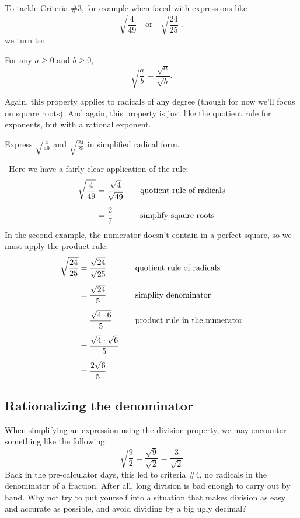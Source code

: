 To tackle Criteria \#3, for example when faced with expressions like \[\sqrt{\frac{4}{49}} \quad\text{or}\quad \sqrt{\frac{24}{25}}~,\]we turn to:

\begin{boxeddef}
For any $a \geq 0$ and $b \geq 0$, \[\sqrt{\frac{a}{b}} = \dfrac{\sqrt{a}}{\sqrt{b}}.\]
\end{boxeddef}

Again, this property applies to radicals of any degree (though for now we'll focus on square roots). And again, this property is just like the quotient rule for exponents, but with a rational exponent.

\begin{boxedex}
Express $\sqrt{\frac{4}{49}}$ and $\sqrt{\frac{24}{25}}$ in simplified radical form.

\exsoln\ Here we have a fairly clear application of the rule:
\[\begin{aligned}
\sqrt{\frac{4}{49}}	&= \frac{\sqrt{4}}{\sqrt{49}}
&& \text{\quad quotient rule of radicals}\\[1ex]
&= \frac{2}{7}
&& \text{\quad simplify sqaure roots}\\
\end{aligned}
\]
In the second example, the numerator doesn't contain in a perfect square, so we must apply the product rule.
\[\begin{aligned}
\sqrt{\frac{24}{25}}	&= \frac{\sqrt{24}}{\sqrt{25}}
&& \text{\quad quotient rule of radicals}\\[1ex]
&= \frac{\sqrt{24}}{5}
&& \text{\quad simplify denominator}\\[1ex]
&= \frac{\sqrt{4\cdot6}}{5}
&& \text{\quad product rule in the numerator}\\[1ex]
&= \frac{\sqrt{4}\cdot\sqrt{6}}{5}\\[1ex]
&= \frac{2\sqrt{6}}{5}
\end{aligned}
\]
\end{boxedex}

\subsection{Rationalizing the denominator}

When simplifying an expression using the division property, we may encounter something like the following: \[\sqrt{\frac{9}{2}} = \frac{\sqrt{9}}{\sqrt{2}} = \frac{3}{\sqrt{2}}\]
Back in the pre-calculator days, this led to criteria \#4, no radicals in the denominator of a fraction. After all, long division is bad enough to carry out by hand. Why not try to put yourself into a situation that makes division as easy and accurate as possible, and avoid dividing by a big ugly decimal?

